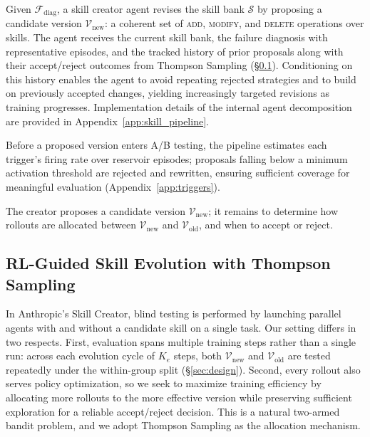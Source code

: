 \documentclass{article}
\theoremstyle{plain}
\theoremstyle{definition}
\theoremstyle{remark}
\begin{document}
Given $\mathcal{F}_{\text{diag}}$, a skill creator agent revises the skill bank $\mathcal{S}$ by proposing a candidate version $\mathcal{V}_{\text{new}}$: a coherent set of \textsc{add}, \textsc{modify}, and \textsc{delete} operations over skills. The agent receives the current skill bank, the failure diagnosis with representative episodes, and the tracked history of prior proposals along with their accept/reject outcomes from Thompson Sampling (\S\ref{sec:skill_evolution}). Conditioning on this history enables the agent to avoid repeating rejected strategies and to build on previously accepted changes, yielding increasingly targeted revisions as training progresses. Implementation details of the internal agent decomposition are provided in Appendix~\ref{app:skill_pipeline}.

Before a proposed version enters A/B testing, the pipeline estimates each trigger's firing rate over reservoir episodes; proposals falling below a minimum activation threshold are rejected and rewritten, ensuring sufficient coverage for meaningful evaluation (Appendix~\ref{app:triggers}).

The creator proposes a candidate version $\mathcal{V}_{\text{new}}$; it remains to determine how rollouts are allocated between $\mathcal{V}_{\text{new}}$ and $\mathcal{V}_{\text{old}}$, and when to accept or reject.


\subsection{RL-Guided Skill Evolution with Thompson Sampling}
\label{sec:skill_evolution}

In Anthropic's Skill Creator, blind testing is performed by launching parallel agents with and without a candidate skill on a single task. Our setting differs in two respects. First, evaluation spans multiple training steps rather than a single run: across each evolution cycle of $K_e$ steps, both $\mathcal{V}_{\text{new}}$ and $\mathcal{V}_{\text{old}}$ are tested repeatedly under the within-group split (\S\ref{sec:design}). Second, every rollout also serves policy optimization, so we seek to maximize training efficiency by allocating more rollouts to the more effective version while preserving sufficient exploration for a reliable accept/reject decision. This is a natural two-armed bandit problem, and we adopt Thompson Sampling \citep{thompson1933likelihood, russo2018tutorial} as the allocation mechanism.
\end{document}
